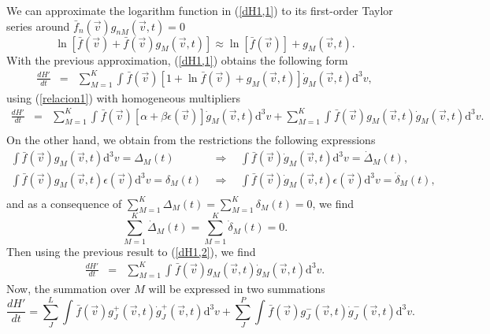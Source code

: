 \documentclass{article}
\begin{document}
We can approximate the logarithm function in (\ref{dH1,1}) to its first-order Taylor series around $\bar f_n(\vec{v}) g_{nM}(\vec{v},t)=0$ 
\begin{equation}
    \ln [\bar{f}(\vec{v})+\bar{f}(\vec{v}) g_{M}(\vec{v},t)] \approx \ln [\bar{f}(\vec{v})]+ g_{M}(\vec{v},t). \label{lnapproximationclassical}
\end{equation}
With the previous approximation, (\ref{dH1,1}) obtains the following form 
\begin{eqnarray}
    \frac{dH'}{dt}&=&\sum_{M=1}^{K} \int_{}^{} \bar f(\vec{v})\left[ 1+\ln \bar f(\vec{v})+g_M(\vec{v},t) \right]\dot g_M(\vec{v},t)\mathrm{d}^3v,
\end{eqnarray}{}
using (\ref{relacion1}) with homogeneous multipliers
\begin{eqnarray}
    \frac{dH'}{dt}&=&\sum_{M=1}^{K}\int_{}^{}\bar f(\vec{v})\left[ \alpha+\beta \epsilon(\vec{v}) \right]\dot g_M(\vec{v},t)\mathrm{d}^3v +\sum_{M=1}^{K}\int_{}^{}\bar f(\vec{v})g_M(\vec{v},t)\dot g_M(\vec{v},t)\mathrm{d}^3v \label{dH1,2}. \nonumber \\
\end{eqnarray}
On the other hand, we obtain from the restrictions the following expressions
\begin{eqnarray}
    \int \bar{f}(\vec{v}) g_{M}(\vec{v},t) \mathrm{d}^{3}v=\Delta_M(t) \ \  &\Rightarrow& \ \  \int \bar{f}(\vec{v}) \dot{g}_{M}(\vec{v},t)\mathrm{d}^{3}v=\dot{\Delta}_M(t), \nonumber \\
    \int  \bar{f}(\vec{v}) g_{M}(\vec{v},t)\epsilon(\vec{v}) \mathrm{d}^{3}v=\delta_M(t) \ \  &\Rightarrow& \ \  \int \bar{f}(\vec{v}) \dot{g}_{M}(\vec{v},t)\epsilon(\vec{v}) \mathrm{d}^{3}v=\dot{\delta}_M(t), \nonumber \\
\end{eqnarray}{}
and as a consequence of $\sum_{M=1}^{K}
\Delta_M(t)  =\sum_{M=1}^{K} \delta_M(t) =0$, we find
\begin{equation}
    \sum_{M=1}^{K} \dot{\Delta}_M(t)  =\sum_{M=1}^{K} \dot{\delta}_{M}(t) =0.
\end{equation}
Then using the previous result to (\ref{dH1,2}), we find
\begin{eqnarray}
\frac{dH'}{dt}&=&\sum_{M=1}^{K}\int_{}^{}\bar f(\vec{v})g_M(\vec{v},t)\dot g_M(\vec{v},t)\mathrm{d}^3v.
\end{eqnarray}
Now, the summation over $M$ will be expressed in two summations
\begin{equation}
    \frac{dH'}{dt}=\sum_J^{L}\int_{}^{}\bar f(\vec{v})g_J^{+}(\vec{v},t)\dot g_J^{+}(\vec{v},t)\mathrm{d}^3v +\sum_J^{P}\int_{}^{}\bar f(\vec{v})g_J^{-}(\vec{v},t)\dot g_J^{-}(\vec{v},t)\mathrm{d}^3v. \label{classicalH3}
\end{equation}
\end{document}
